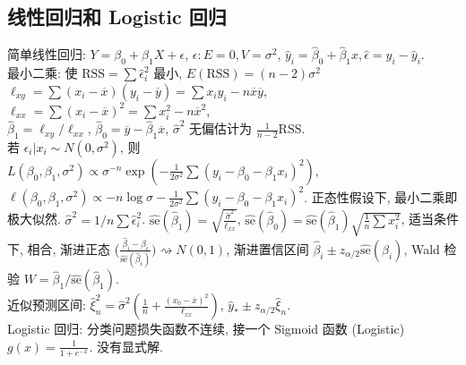 \documentclass[a4paper, landscape,10pt]{article}
\begin{document}
\begin{multicols}{4}
\setcounter{section}{12}
\section{线性回归和 Logistic 回归}
简单线性回归: $Y = \beta_0 + \beta_1 X + \epsilon$, $\epsilon : E=0, V=\sigma^2$,
$\hat y_i = \hat \beta_0 + \hat \beta_1 x, \hat \epsilon = y_i - \hat y_i$.\\
最小二乘: 使 $\mathrm{RSS} = \sum \hat \epsilon_i^2$ 最小, $E(\mathrm{RSS}) = (n - 2)\sigma^2$ \\
$\ell_{xy}= \sum (x_i - \overline x)(y_i - \overline y) = \sum x_i y_i - n \overline x \overline y$, \\
$\ell_{xx} = \sum (x_i - \overline x)^2 = \sum x_i^2 - n \overline x^2$, \\
$\hat \beta_1 = \ell_{xy} / \ell_{xx}$, $\hat \beta_0 = \overline y - \hat \beta_1 \overline x$, $\hat \sigma ^ 2$ 无偏估计为 $\frac{1}{n - 2} \mathrm{RSS}$. \\
若 $\epsilon_i | x_i \sim N(0, \sigma^2)$, 则 \\
$L(\beta_0, \beta_1, \sigma^2) \propto \sigma^{-n} \exp \left( - \frac{1}{2\sigma^2} \sum (y_i - \beta_0 - \beta_1 x_i)^2 \right)$,
$\ell(\beta_0, \beta_1, \sigma^2) \propto -n \log \sigma - \frac{1}{2\sigma^2} \sum (y_i - \beta_0 - \beta_1 x_i)^2$.
正态性假设下, 最小二乘即极大似然. $\hat \sigma^2 = 1/n \sum \hat \epsilon_i^2$.
$\hat {\mathrm{se}}(\hat \beta_1) = \sqrt{\frac{\hat \sigma^2}{\ell_{xx}}}$,
$\hat {\mathrm{se}}(\hat \beta_0) = \hat {\mathrm{se}}(\hat \beta_1) \sqrt{\frac{1}{n} \sum x_i^2}$,
适当条件下, 相合, 渐进正态 ($\frac{\hat \beta_i - \beta_i}{\hat{\mathrm{se}}(\hat\beta_i)}) \rightsquigarrow N(0, 1)$,
渐进置信区间 $\hat \beta_i \pm z_{\alpha/2} \hat{\mathrm{se}}(\hat\beta_i)$, Wald 检验 $W=\hat \beta_1 / \hat{\mathrm{se}}(\hat\beta_1)$. \\
近似预测区间: $\hat \xi_n^2 = \hat \sigma^2 \left( \frac{1}{n} + \frac{(x_0 - \overline x)^2}{\ell_{xx}} \right)$, $\hat y_* \pm z_{\alpha/2} \hat \xi_n$. \\
Logistic 回归: 分类问题损失函数不连续, 接一个 Sigmoid 函数 (Logistic) $g(x) = \frac{1}{1 + e^{-x}}$. 没有显式解. \\
\end{multicols}
	
\end{document}
